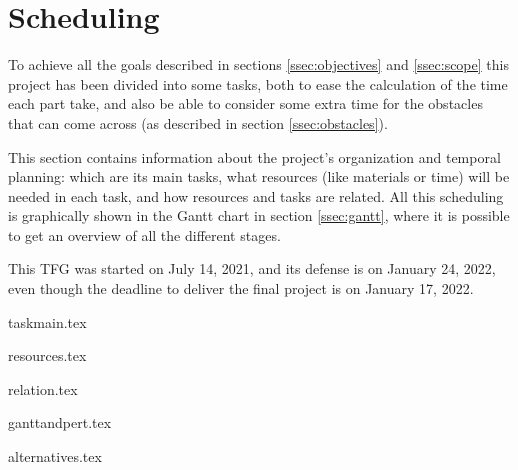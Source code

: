 \section{Scheduling}
\label{sec:sched}
To achieve all the goals described in sections \ref{ssec:objectives} and \ref{ssec:scope} this project has been divided into some tasks, both to ease the calculation of the time each part take, and also be able to consider some extra time for the obstacles that can come across (as described in section \ref{ssec:obstacles}). 

This section contains information about the project's organization and temporal planning: which are its main tasks, what resources (like materials or time) will be needed in each task, and how resources and tasks are related. All this scheduling is graphically shown in the Gantt chart in section \ref{ssec:gantt}, where it is possible to get an overview of all the different stages.

This TFG was started on July 14, 2021, and its defense is on January 24, 2022, even though the deadline to deliver the final project is on January 17, 2022.

{taskmain.tex}

\pagebreak
{resources.tex}

\pagebreak
{relation.tex}

{ganttandpert.tex}


{alternatives.tex}